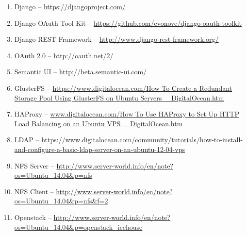\documentclass[12pt]{report}
\begin{document}
\begin{enumerate}
	\item Django -- \url{https://djangoproject.com/}
	\item Django OAuth Tool Kit -- \url{https://github.com/evonove/django-oauth-toolkit}
	\item Django REST Framework -- \url{http://www.django-rest-framework.org/}
	\item OAuth 2.0 -- \url{http://oauth.net/2/}
	\item Semantic UI -- \url{http://beta.semantic-ui.com/}
	\item GlusterFS -- \url{https://www.digitalocean.com/How To Create a Redundant Storage Pool Using GlusterFS on Ubuntu Servers _ DigitalOcean.htm}
	\item HAProxy -- \url{www.digitalocean.com/How To Use HAProxy to Set Up HTTP Load Balancing on an Ubuntu VPS _ DigitalOcean.htm}
	\item LDAP -- \url{https://www.digitalocean.com/community/tutorials/how-to-install-and-configure-a-basic-ldap-server-on-an-ubuntu-12-04-vps}
	\item NFS Server -- \url{http://www.server-world.info/en/note?os=Ubuntu_14.04&p=nfs}
	\item NFS Client -- \url{http://www.server-world.info/en/note?os=Ubuntu_14.04&p=nfs&f=2}
	\item Openstack -- \url{http://www.server-world.info/en/note?os=Ubuntu_14.04&p=openstack_icehouse}
\end{enumerate}
\end{document}
